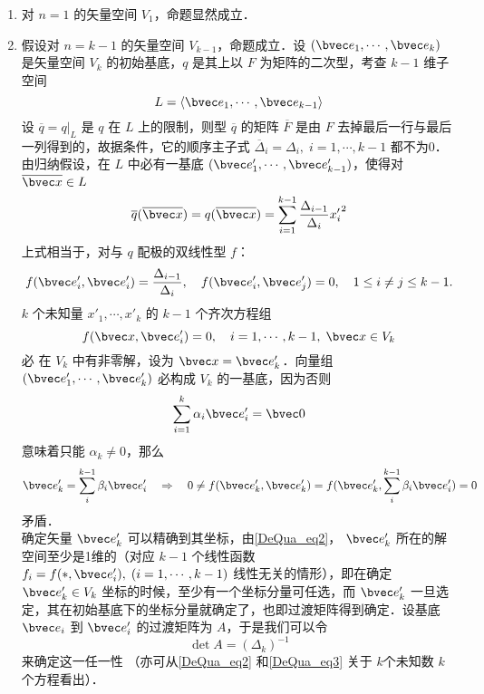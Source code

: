 \begin{enumerate}
\item 对 $n=1$ 的矢量空间 $V_1$，命题显然成立．
\item 假设对 $n=k-1$ 的矢量空间 $V_{k-1}$，命题成立．设 $(\bvec e_1,\cdots,\bvec e_k)$ 是矢量空间 $V_k$ 的初始基底，$q$ 是其上以 $F$ 为矩阵的二次型，考查 $k-1$ 维子空间
\begin{equation}
L=\langle\bvec e_1,\cdots,\bvec e_{k-1}\rangle
\end{equation}
设 $\overline q=q|_L$ 是 $q$ 在 $L$ 上的限制，则型 $\overline q$ 的矩阵 $\overline F$ 是由 $F$ 去掉最后一行与最后一列得到的，故据条件，它的顺序主子式 $\overline\Delta_i=\Delta_i,\;i=1,\cdots,k-1$ 都不为0．由归纳假设，在 $L$ 中必有一基底 $(\bvec e'_1,\cdots,\bvec e'_{k-1})$，使得对 $\overline{\bvec x}\in L$
\begin{equation}
\overline q(\overline{\bvec x})=q(\overline{\bvec x})=\sum_{i=1}^{k-1}\frac{\Delta_{i-1}}{\Delta_i}{x'_{i}}^2
\end{equation}
上式相当于，对与 $q$ 配极的双线性型 $f$：
\begin{equation}
f(\bvec e'_i,\bvec e'_i)=\frac{\Delta_{i-1}}{\Delta_{i}},\quad f(\bvec e'_i,\bvec e'_j)=0,\quad 1\leq i\neq j\leq k-1.
\end{equation}
 $k$ 个未知量 $x'_1,\cdots,x'_k$ 的 $k-1$ 个齐次方程组
 \begin{equation}\label{DeQua_eq2}
 f(\bvec x,\bvec e'_i)=0,\quad i=1,\cdots,k-1,\;\bvec x\in V_k
 \end{equation}
 必 在 $V_k$ 中有非零解，设为 $\bvec x=\bvec e'_k$．向量组 $(\bvec e'_1,\cdots,\bvec e'_k)$ 必构成 $V_k$ 的一基底，因为否则
 \begin{equation}
 \sum_{i=1}^k\alpha_i\bvec e'_i=\bvec 0
 \end{equation}
 意味着只能 $\alpha_k\neq0$，那么 
 \begin{equation}
 \bvec e'_k=\sum_i^{k-1}\beta_i\bvec e'_i\quad
 \Rightarrow\quad 0\neq f(\bvec e'_k,\bvec e'_k)=f(\bvec e'_k,\sum_i^{k-1}\beta_i\bvec e'_i)=0
 \end{equation}
 矛盾．\\

 确定矢量 $\bvec e'_k$ 可以精确到其坐标，由\autoref{DeQua_eq2}， $\bvec e'_k$ 所在的解空间至少是1维的（对应 $k-1$ 个线性函数 $f_i=f(*,\bvec e'_i),\;(i=1,\cdots,k-1)$ 线性无关的情形），即在确定 $\bvec e'_k\in V_k$ 坐标的时候，至少有一个坐标分量可任选，而 $\bvec e'_k$ 一旦选定，其在初始基底下的坐标分量就确定了，也即过渡矩阵得到确定．设基底 $\bvec e_i$ 到 $\bvec e'_i$ 的过渡矩阵为 $A$，于是我们可以令
 \begin{equation}\label{DeQua_eq3}
 \det A=(\Delta_k)^{-1}
 \end{equation}
 来确定这一任一性 （亦可从\autoref{DeQua_eq2} 和\autoref{DeQua_eq3} 关于 $k$个未知数 $k$ 个方程看出）．


\end{enumerate}

